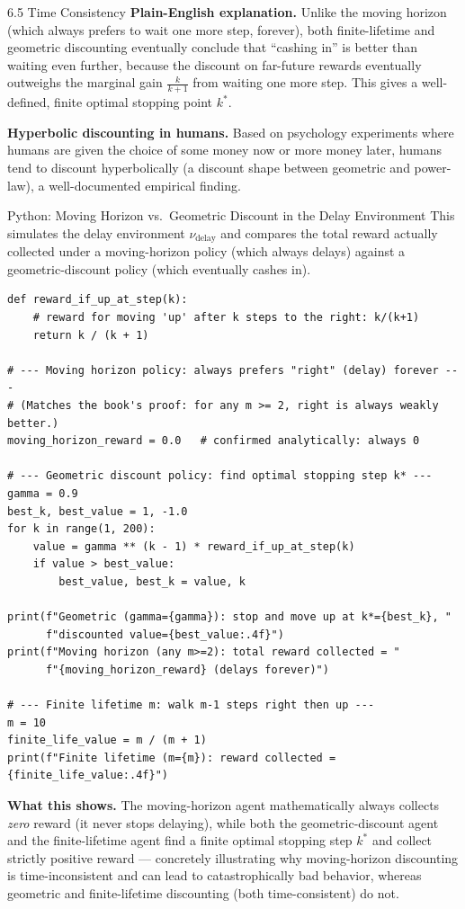 \documentclass[aspectratio=169,10pt]{beamer}
\begin{document}
\begin{frame}[allowframebreaks]{6.5 Time Consistency}
\textbf{Plain-English explanation.} Unlike the moving horizon (which always
prefers to wait one more step, forever), both finite-lifetime and
geometric discounting eventually conclude that ``cashing in'' is better
than waiting even further, because the discount on far-future rewards
eventually outweighs the marginal gain $\frac{k}{k+1}$ from waiting one
more step. This gives a well-defined, finite optimal stopping point
$k^{*}$.

\vspace{0.2cm}
\textbf{Hyperbolic discounting in humans.} Based on psychology experiments
where humans are given the choice of some money now or more money later,
humans tend to discount hyperbolically (a discount shape between geometric
and power-law), a well-documented empirical finding.
\end{frame}

\begin{frame}[fragile]{Python: Moving Horizon vs.\ Geometric Discount in the Delay Environment}
This simulates the delay environment $\nu_{\text{delay}}$ and compares the
total reward actually collected under a moving-horizon policy (which always
delays) against a geometric-discount policy (which eventually cashes in).

\begin{lstlisting}
def reward_if_up_at_step(k):
    # reward for moving 'up' after k steps to the right: k/(k+1)
    return k / (k + 1)

# --- Moving horizon policy: always prefers "right" (delay) forever ---
# (Matches the book's proof: for any m >= 2, right is always weakly better.)
moving_horizon_reward = 0.0   # confirmed analytically: always 0

# --- Geometric discount policy: find optimal stopping step k* ---
gamma = 0.9
best_k, best_value = 1, -1.0
for k in range(1, 200):
    value = gamma ** (k - 1) * reward_if_up_at_step(k)
    if value > best_value:
        best_value, best_k = value, k

print(f"Geometric (gamma={gamma}): stop and move up at k*={best_k}, "
      f"discounted value={best_value:.4f}")
print(f"Moving horizon (any m>=2): total reward collected = "
      f"{moving_horizon_reward} (delays forever)")

# --- Finite lifetime m: walk m-1 steps right then up ---
m = 10
finite_life_value = m / (m + 1)
print(f"Finite lifetime (m={m}): reward collected = {finite_life_value:.4f}")
\end{lstlisting}

\textbf{What this shows.} The moving-horizon agent mathematically always
collects \emph{zero} reward (it never stops delaying), while both the
geometric-discount agent and the finite-lifetime agent find a finite
optimal stopping step $k^{*}$ and collect strictly positive reward ---
concretely illustrating why moving-horizon discounting is time-inconsistent
and can lead to catastrophically bad behavior, whereas geometric and
finite-lifetime discounting (both time-consistent) do not.
\end{frame}
\end{document}
